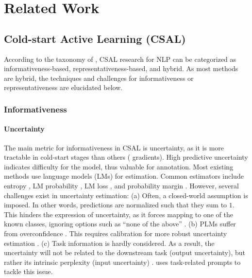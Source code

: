 \section{Related Work}
\label{sec:related-work}

\subsection{Cold-start Active Learning (CSAL)}
\label{sec:csal-taxonomy}

According to the taxonomy of \citet{zhang-etal-2022-survey}, CSAL research for NLP can be categorized as informativeness-based, representativeness-based, and hybrid.
As most methods are hybrid, the techniques and challenges for informativeness or representativeness are elucidated below.

\subsubsection{Informativeness}
\label{subsubsec:informativeness}

\paragraph{Uncertainty}
The main metric for informativeness in CSAL is uncertainty, as it is more tractable in cold-start stages than others (\eg{} gradients).
High predictive uncertainty indicates difficulty for the model, thus valuable for annotation.
Most existing methods use language models (LMs) for estimation.
Common estimators include
entropy \citep{zhu-etal-2008-active,yu-etal-2023-cold},
LM probability \citep{dligach-palmer-2011-good},
LM loss \citep{yuan-etal-2020-cold}, and
probability margin \citep{10.1007/978-3-031-08473-7_9}.
However, several challenges exist in uncertainty estimation:
(a)
Often, a closed-world assumption is imposed.
In other words, predictions are normalized such that they sum to $1$.
This hinders the expression of uncertainty, as it forces mapping to one of the known classes, ignoring options such as ``none of the above'' \citep{ova-unc}.
(b) PLMs suffer from overconfidence \citep{park-caragea-2022-calibration,wang2023calibration}.
This requires calibration for more robust uncertainty estimation \citep{yu-etal-2023-cold}.
(c)
Task information is hardly considered.
As a result, the uncertainty will not be related to the downstream task (output uncertainty), but rather its intrinsic perplexity (input uncertainty) \citep{jiang-etal-2021-know}.
\patron{} \citep{yu-etal-2023-cold} uses task-related prompts to tackle this issue.

